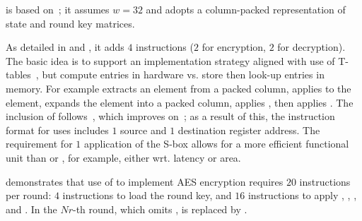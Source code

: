 
is based on~\cite{NadIkeKur:04,BBFR:06,Saarinen:20}; it
assumes 
$w = 32$
and adopts a 
column-packed 
representation of state and round key matrices.

As detailed in
and
,
it adds
$ 4$
instructions ($2$ for encryption, $2$ for decryption).
The basic idea is to support an implementation strategy aligned with use
of 
T-tables~\cite[Section 4.2]{DaeRij:02}, 
but compute entries in hardware vs. store then look-up entries in memory.
For example
extracts                     an     element from a packed column,
 applies   to the element,
 expands                        the element into a packed column,
 applies ,
then
 applies .
The inclusion of  follows~\cite{Saarinen:20}, which
improves on~\cite{NadIkeKur:04,BBFR:06}; as a result of this,
the instruction format for
uses 
includes $1$ source and $1$ destination register address.
The requirement for $1$ application  of the S-box
allows for a more efficient functional unit than  or , for
example, either wrt. latency or area.

demonstrates that use of  to implement AES encryption requires
$20$
instructions per round:
$ 4$            instructions to load the round key,
and
$16$  instructions to apply , , , and .
In the $Nr$-th round, which omits ,
is replaced by 
     .

